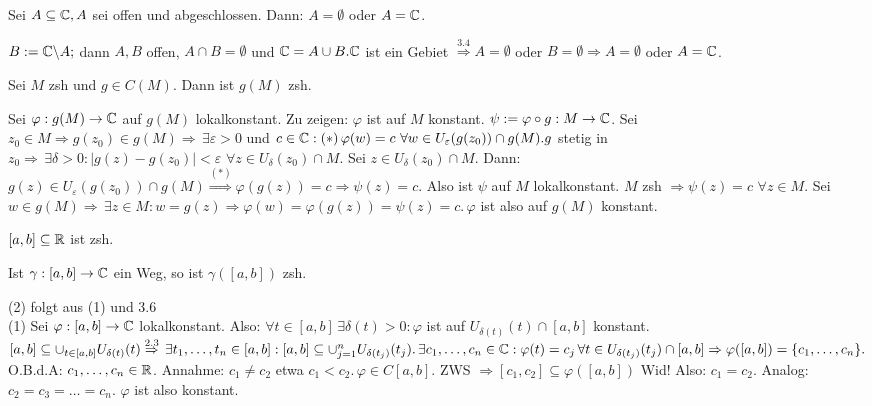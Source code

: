 \documentclass[a4paper,twoside,DIV15,BCOR12mm]{scrbook}
\begin{document}
\begin{folgerung}
Sei $A \subseteq \mathbb{C}, A$ sei offen und abgeschlossen. Dann: $A = \emptyset$ oder $A = \mathbb{C}$.
\end{folgerung}
\begin{beweis}
$B:= \mathbb{C} \backslash A;$ dann $A,B$ offen, $A \cap B = \emptyset$ und $\mathbb{C} = A \cup B. \mathbb{C}$ ist ein Gebiet $\stackrel{3.4}{\Rightarrow} A = \emptyset$ oder $B = \emptyset \Rightarrow A = \emptyset$ oder $A = \mathbb{C}$.
\end{beweis}

\begin{satz}
Sei $M$ zsh und $g \in C(M)$. Dann ist $g(M)$ zsh.
\end{satz}
\begin{beweis}
Sei $\varphi: g(M) \rightarrow \mathbb{C}$ auf $g(M)$ lokalkonstant. Zu zeigen: $\varphi$ ist auf $M$ konstant. $\psi := \varphi \circ g: M \rightarrow \mathbb{C}$. Sei $z_0 \in M \Rightarrow g(z_0) \in g(M) \Rightarrow \, \exists \varepsilon > 0$ und $c \in \mathbb{C}: (\ast) \, \varphi(w) = c \,\, \forall w \in U_{\varepsilon}(g(z_0)) \cap g(M). g$ stetig in $z_0 \Rightarrow \, \exists \delta >0: |g(z) - g(z_0)| < \varepsilon \,\, \forall z \in U_{\delta}(z_0) \cap M$.
Sei $z \in U_{\delta}(z_0) \cap M$. Dann: $g(z) \in U_{\varepsilon}(g(z_0)) \cap g(M) \stackrel{(\ast)}{\Rightarrow} \varphi(g(z)) = c \Rightarrow \psi(z) = c$.
Also ist $\psi$ auf $M$ lokalkonstant. $M$ zsh $\Rightarrow \psi(z) = c \,\, \forall z \in M.$ Sei $w \in g(M) \Rightarrow \, \exists z \in M: w=g(z) \Rightarrow \varphi(w) = \varphi(g(z)) = \psi(z) = c. \, \varphi$ ist also auf $g(M)$ konstant.
\end{beweis}

\begin{beispiele}
\item $[a,b] \subseteq \mathbb{R}$ ist zsh.
\item Ist $\gamma: [a,b] \rightarrow \mathbb{C}$ ein Weg, so ist $\gamma([a,b])$ zsh.
\end{beispiele}

\begin{beweis}
(2) folgt aus (1) und 3.6\\
(1) Sei $\varphi:[a,b] \rightarrow \mathbb{C}$ lokalkonstant. Also: $\forall t \in [a,b] \, \exists \delta(t) > 0: \varphi$ ist auf $U_{\delta(t)}(t) \cap [a,b]$ konstant. $[a,b] \subseteq \cup_{t \in [a,b]} U_{\delta(t)}(t) \stackrel{2.3}{\Rightarrow} \, \exists t_1,\dots,t_n \in [a,b]: [a,b] \subseteq \cup_{j=1}^n U_{\delta(t_j)}(t_j). \, \exists c_1,\dots,c_n \in \mathbb{C}: \varphi(t) = c_j \, \forall t \in U_{\delta(t_j)}(t_j) \cap [a,b] \Rightarrow \varphi([a,b]) = \{c_1,\dots,c_n\}.$ O.B.d.A: $c_1,\dots,c_n \in \mathbb{R}$. Annahme: $c_1 \not= c_2$ etwa $c_1 < c_2. \, \varphi \in C[a,b].$ ZWS $\Rightarrow [c_1,c_2] \subseteq \varphi([a,b])$ Wid! Also: $c_1 = c_2$. Analog: $c_2=c_3=\dots=c_n. \,\, \varphi$ ist also konstant.
\end{beweis}
\end{document}
